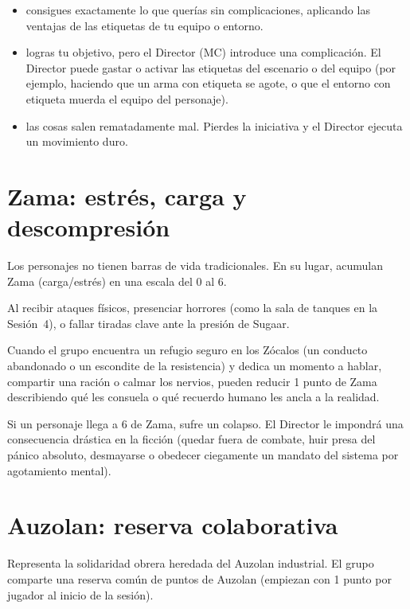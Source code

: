 \begin{itemize}
  \item {} consigues exactamente lo que querías sin complicaciones, aplicando las ventajas de las etiquetas de tu equipo o entorno.
  \item {} logras tu objetivo, pero el Director (MC) introduce una complicación. El Director puede gastar o activar las etiquetas del escenario o del equipo (por ejemplo, haciendo que un arma con etiqueta  se agote, o que el entorno con etiqueta  muerda el equipo del personaje).
  \item {} las cosas salen rematadamente mal. Pierdes la iniciativa y el Director ejecuta un movimiento duro.
\end{itemize}

\section{Zama: estrés, carga y descompresión}

Los personajes no tienen barras de vida tradicionales. En su lugar, acumulan Zama (carga/estrés) en una escala del 0 al 6.

 Al recibir ataques físicos, presenciar horrores (como la sala de tanques en la Sesión~4), o fallar tiradas clave ante la presión de Sugaar.

 Cuando el grupo encuentra un refugio seguro en los Zócalos (un conducto abandonado o un escondite de la resistencia) y dedica un momento a hablar, compartir una ración o calmar los nervios, pueden reducir 1 punto de Zama describiendo qué les consuela o qué recuerdo humano les ancla a la realidad.

 Si un personaje llega a 6 de Zama, sufre un colapso. El Director le impondrá una consecuencia drástica en la ficción (quedar fuera de combate, huir presa del pánico absoluto, desmayarse o obedecer ciegamente un mandato del sistema por agotamiento mental).

\section{Auzolan: reserva colaborativa}

Representa la solidaridad obrera heredada del Auzolan industrial. El grupo comparte una reserva común de puntos de Auzolan (empiezan con 1 punto por jugador al inicio de la sesión).


